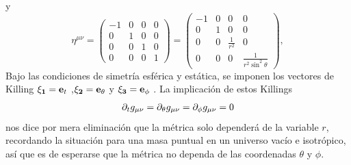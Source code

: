 y
\begin{equation}
    \eta^{\mu \nu}=\left(\begin{array}{cccc}
            -1 & 0 & 0 & 0 \\
            0  & 1 & 0 & 0 \\
            0  & 0 & 1 & 0 \\
            0  & 0 & 0 & 1
        \end{array}\right)=\left(\begin{array}{cccc}
            -1 & 0 & 0               & 0                                \\
            0  & 1 & 0               & 0                                \\
            0  & 0 & \frac{1}{r^{2}} & 0                                \\
            0  & 0 & 0               & \frac{1}{r^{2} \sin ^{2} \theta}
        \end{array}\right),
\end{equation}
Bajo las condiciones de simetría esférica y estática, se imponen los  vectores de Killing $\mathbf{\xi_1 }= \mathbf{e}_t$ ,$\mathbf{\xi_2 }= \mathbf{e}_\theta$ y $\mathbf{\xi_3} = \mathbf{e}_\phi$ .
La implicación de estos Killings
\begin{align}
    \partial_{t}{g_{\mu \nu}} =\partial_{\theta}{g_{\mu \nu}}= \partial_{\phi}{g_{\mu \nu}} = 0
\end{align}
nos dice por mera eliminación que la métrica solo dependerá de la variable $r$, recordando la situación para una masa puntual en un universo vacío e isotrópico, así que es de esperarse que la métrica no dependa de las coordenadas $\theta$ y $\phi$.


